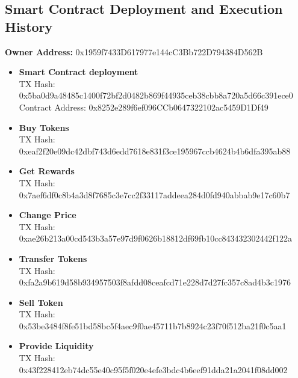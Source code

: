 \documentclass[12pt,a4paper]{article}
\begin{document}
\subsection*{Smart Contract Deployment and Execution History}

\textbf{Owner Address:} 0x1959f7433D617977e144cC3Bb722D794384D562B

\begin{itemize}
    \item \textbf{Smart Contract deployment}\\
    TX Hash: 0x5ba0d9a48485c1400f72bf2d0482b869f44935ceb38cbb8a720a5d66c391ece0 \\
    Contract Address: 0x8252e289f6ef096CCb0647322102ac5459D1Df49
    \item \textbf{Buy Tokens}\\
    TX Hash: 0xeaf2f20e09dc42dbf743d6edd7618e831f3ce195967ccb4624b4b6dfa395ab88
    \item \textbf{Get Rewards}\\
    TX Hash: 0x7aef6df0c8b4a3d8f7685c3e7cc2f33117addeea284d0fd940abbab9e17c60b7
    \item \textbf{Change Price}\\
    TX Hash: 0xae26b213a00cd543b3a57e97d9f0626b18812df69fb10cc843432302442f122a
    \item \textbf{Transfer Tokens}\\
    TX Hash: 0xfa2a9b619d58b934957503f8afdd08ceafcd71e228d7d27fc357c8ad4b3c1976
    \item \textbf{Sell Token}\\
    TX Hash: 0x53be3484f8fe51bd58bc5f4aec9f0ae45711b7b8924c23f70f512ba21f0c5aa1
    \item \textbf{Provide Liquidity}\\
    TX Hash: 0x43f228412eb74dc55e40c95f5f020e4efe3bdc4b6eef91dda21a2041f08dd002
\end{itemize}

\pagebreak
\end{document}
